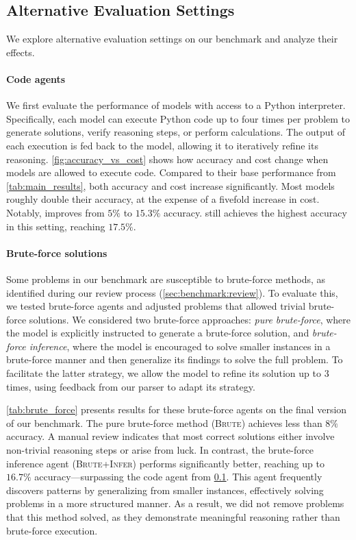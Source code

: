 
\subsection{Alternative Evaluation Settings} \label{sec:alternative_eval}

We explore alternative evaluation settings on our benchmark and analyze their effects.  

\paragraph{Code agents} We first evaluate the performance of models with access to a Python interpreter. Specifically, each model can execute Python code up to four times per problem to generate solutions, verify reasoning steps, or perform calculations. The output of each execution is fed back to the model, allowing it to iteratively refine its reasoning. \cref{fig:accuracy_vs_cost} shows how accuracy and cost change when models are allowed to execute code. Compared to their base performance from \cref{tab:main_results}, both accuracy and cost increase significantly. Most models roughly double their accuracy, at the expense of a fivefold increase in cost. Notably, \claudesonnet{} improves from $5\%$ to $15.3\%$ accuracy. \flash{} still achieves the highest accuracy in this setting, reaching $17.5\%$.


\paragraph{Brute-force solutions} Some problems in our benchmark are susceptible to brute-force methods, as identified during our review process (\cref{sec:benchmark:review}). To evaluate this, we tested brute-force agents and adjusted problems that allowed trivial brute-force solutions. We considered two brute-force approaches: \emph{pure brute-force}, where the model is explicitly instructed to generate a brute-force solution, and \emph{brute-force inference}, where the model is encouraged to solve smaller instances in a brute-force manner and then generalize its findings to solve the full problem. To facilitate the latter strategy, we allow the model to refine its solution up to $3$ times, using feedback from our parser to adapt its strategy.

\cref{tab:brute_force} presents results for these brute-force agents on the final version of our benchmark. The pure brute-force method (\textsc{Brute}) achieves less than $8\%$ accuracy. A manual review indicates that most correct solutions either involve non-trivial reasoning steps or arise from luck. In contrast, the brute-force inference agent (\textsc{Brute+Infer}) performs significantly better, reaching up to $16.7\%$ accuracy—surpassing the code agent from \cref{sec:alternative_eval}. This agent frequently discovers patterns by generalizing from smaller instances, effectively solving problems in a more structured manner. As a result, we did not remove problems that this method solved, as they demonstrate meaningful reasoning rather than brute-force execution.


  
